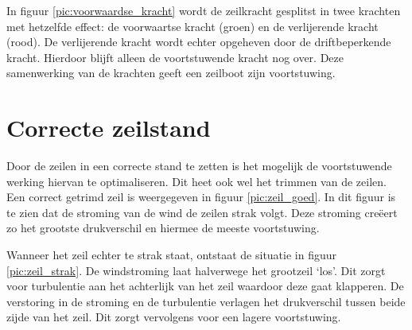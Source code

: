 In figuur \ref{pic:voorwaardse_kracht} wordt de zeilkracht gesplitst in twee krachten met hetzelfde effect: de voorwaartse kracht (groen) en de verlijerende kracht (rood). De verlijerende kracht wordt echter opgeheven door de driftbeperkende kracht. Hierdoor blijft alleen de voortstuwende kracht nog over. Deze samenwerking van de krachten geeft een zeilboot zijn voortstuwing.

\section{Correcte zeilstand}
Door de zeilen in een correcte stand te zetten is het mogelijk de voortstuwende werking hiervan te optimaliseren. Dit heet ook wel het trimmen van de zeilen. Een correct getrimd zeil is weergegeven in figuur \ref{pic:zeil_goed}. In dit figuur is te zien dat de stroming van de wind de zeilen strak volgt. Deze stroming creëert zo het grootste drukverschil en hiermee de meeste voortstuwing. 

Wanneer het zeil echter te strak staat, ontstaat de situatie in figuur \ref{pic:zeil_strak}. De windstroming laat halverwege het grootzeil `los'. Dit zorgt voor turbulentie aan het achterlijk van het zeil waardoor deze gaat klapperen. De verstoring in de stroming en de turbulentie verlagen het drukverschil tussen beide zijde van het zeil. Dit zorgt vervolgens voor een lagere voortstuwing.

